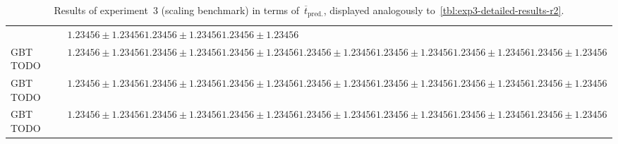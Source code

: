 \begin{table}[h]
{\begin{tabular}{lrrrrrrrr}
						& $\num{1.23456} \pm \num{1.23456}$
						& $\num{1.23456} \pm \num{1.23456}$
						& $\num{1.23456} \pm \num{1.23456}$
		\\
		GBT TODO
						& $\num{1.23456} \pm \num{1.23456}$
						& $\num{1.23456} \pm \num{1.23456}$
						& $\num{1.23456} \pm \num{1.23456}$
						& $\num{1.23456} \pm \num{1.23456}$
						& $\num{1.23456} \pm \num{1.23456}$
						& $\num{1.23456} \pm \num{1.23456}$
						& $\num{1.23456} \pm \num{1.23456}$
		\\
		GBT TODO
						& $\num{1.23456} \pm \num{1.23456}$
						& $\num{1.23456} \pm \num{1.23456}$
						& $\num{1.23456} \pm \num{1.23456}$
						& $\num{1.23456} \pm \num{1.23456}$
						& $\num{1.23456} \pm \num{1.23456}$
						& $\num{1.23456} \pm \num{1.23456}$
						& $\num{1.23456} \pm \num{1.23456}$
		\\
		GBT TODO
						& $\num{1.23456} \pm \num{1.23456}$
						& $\num{1.23456} \pm \num{1.23456}$
						& $\num{1.23456} \pm \num{1.23456}$
						& $\num{1.23456} \pm \num{1.23456}$
						& $\num{1.23456} \pm \num{1.23456}$
						& $\num{1.23456} \pm \num{1.23456}$
						& $\num{1.23456} \pm \num{1.23456}$
		\\
		\bottomrule
		\end{tabular}
	}
	\caption{Results of experiment~3 (scaling benchmark) in terms of~$\overline{t}_{\text{pred.}}$,
	displayed analogously to~\cref{tbl:exp3-detailed-results-r2}.}
	\label{tbl:exp3-detailed-results-t-pred}
\end{table}


